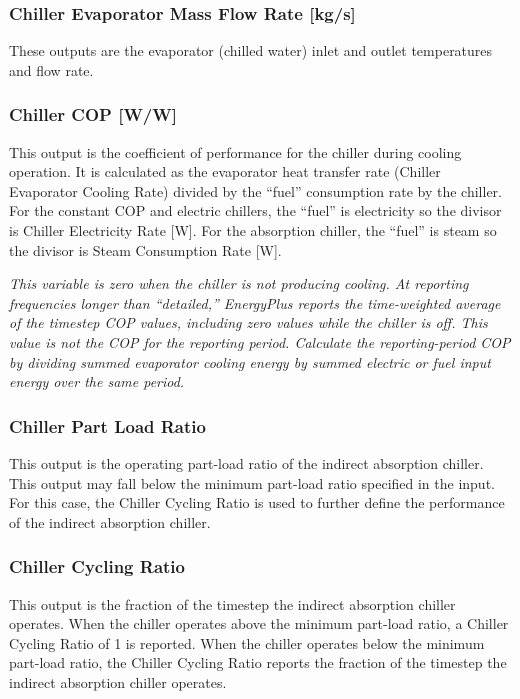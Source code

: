 \subsubsection{Chiller Evaporator Mass Flow Rate {[}kg/s{]}}\label{chiller-evaporator-mass-flow-rate-kgs}

These outputs are the evaporator (chilled water) inlet and outlet temperatures and flow rate.

\subsubsection{Chiller COP {[}W/W{]}}\label{chiller-cop-ww}

This output is the coefficient of performance for the chiller during cooling operation. It is calculated as the evaporator heat transfer rate (Chiller Evaporator Cooling Rate) divided by the ``fuel'' consumption rate by the chiller. For the constant COP and electric chillers, the ``fuel'' is electricity so the divisor is Chiller Electricity Rate {[}W{]}. For the absorption chiller, the ``fuel'' is steam so the divisor is Steam Consumption Rate {[}W{]}.

\emph{This variable is zero when the chiller is not producing cooling. At reporting frequencies longer than ``detailed,'' EnergyPlus reports the time-weighted average of the timestep COP values, including zero values while the chiller is off. This value is not the COP for the reporting period. Calculate the reporting-period COP by dividing summed evaporator cooling energy by summed electric or fuel input energy over the same period.}

\subsubsection{Chiller Part Load Ratio}\label{chiller-part-load-ratio}

This output is the operating part-load ratio of the indirect absorption chiller. This output may fall below the minimum part-load ratio specified in the input. For this case, the Chiller Cycling Ratio is used to further define the performance of the indirect absorption chiller.

\subsubsection{Chiller Cycling Ratio}\label{chiller-cycling-ratio}

This output is the fraction of the timestep the indirect absorption chiller operates. When the chiller operates above the minimum part-load ratio, a Chiller Cycling Ratio of 1 is reported. When the chiller operates below the minimum part-load ratio, the Chiller Cycling Ratio reports the fraction of the timestep the indirect absorption chiller operates.

